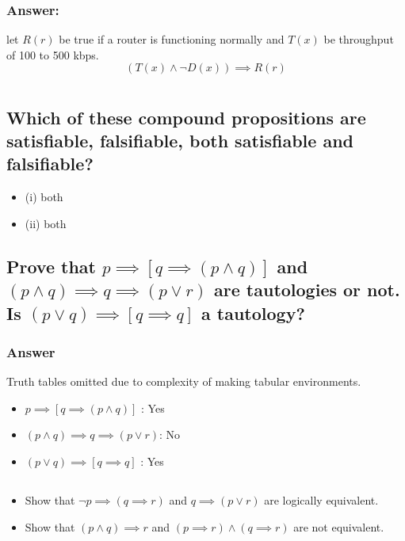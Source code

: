 \documentclass[titlepage]{article}\usepackage[]{graphicx}\usepackage[]{color}
\begin{document}
  \subsubsection{Answer:}
  let $R(r)$ be true if a router is functioning normally and $T(x)$ be throughput of 100 to 500 kbps. 
  \[ (T(x) \land \lnot D(x)) \implies R(r) \]


\section{ }
  \subsection{Which of these compound propositions are satisfiable, falsifiable,
  both satisfiable and falsifiable?}
    \begin{itemize}
      \item (i) both
      \item (ii)  both   
    \end{itemize}


  \subsection{ Prove that $ p \implies [q \implies (p \land q)] $ and $ (p
      \land q) \implies q \implies (p \lor r) $ are tautologies or not. Is $( p
      \lor q) \implies [q \implies q] $ a tautology? } 
  \subsubsection{Answer}
  Truth tables omitted due to complexity of making tabular environments. 
  \begin{itemize}
      \item $ p \implies [q \implies (p \land q)] $ : Yes
      \item $ (p \land q) \implies q \implies (p \lor r) $: No
      \item $( p \lor q) \implies [q \implies q] $ : Yes
  \end{itemize}

  \subsection{ } %
  \begin{itemize}
      \item Show that $\lnot p \implies (q \implies r) $ and 
        $ q \implies (p \lor r)$ are logically equivalent.
      \item Show that $( p \land q) \implies r$ and $(p \implies r) \land (q
        \implies r)$ are not equivalent.
    \end{itemize}
\end{document}
